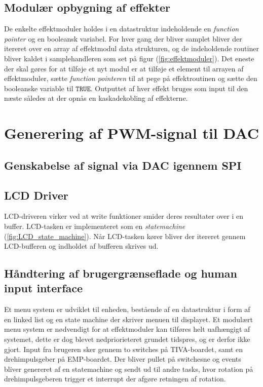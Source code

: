 \subsection{Modulær opbygning af effekter}
De enkelte effektmoduler holdes i en datastruktur indeholdende en \textit{function pointer} og en booleansk variabel.
For hver gang der bliver samplet bliver der itereret over en array af effektmodul data strukturen, og de indeholdende routiner bliver kaldet i samplehandleren som set på figur (\ref{fig:effektmoduler}).\newline
Det eneste der skal gøres for at tilføje et nyt modul er at tilføje et element til arrayen af effektmoduler, sætte \textit{function pointeren} til at pege på effektroutinen og sætte den booleanske variable til $\mathtt{TRUE}$.
Outputtet af hver effekt bruges som input til den næste således at der opnås en kaskadekobling af effekterne.


\section{Generering af PWM-signal til DAC}


\subsection{Genskabelse af signal via DAC igennem SPI}


\subsection{LCD Driver}
LCD-driveren virker ved at write funktioner smider deres resultater over i en buffer.
LCD-tasken er implementeret som en \textit{statemachine} (\ref{fig:LCD_state_machine}).
Når LCD-tasken kører bliver der itereret gennem LCD-bufferen og indholdet af bufferen skrives ud.


\subsection{Håndtering af brugergrænseflade og human input interface}

Et menu system er udviklet til enheden, bestående af en datastruktur i form af en linked list og en state machine der skriver menuen til displayet.
Et modulært menu system er nødvendigt for at effektmoduler kan tilføres helt uafhængigt af systemet, dette er dog blevet nedpriorieteret grundet tidspres, og er derfor ikke gjort.
Input fra brugeren sker gennem to switches på TIVA-boardet, samt en drehimpulsgeber på EMP-boardet.
Der bliver pullet på switchesne og events bliver genereret af en statemachine og sendt ud til andre tasks, hvor rotation på drehimpulsgeberen trigger et interrupt der afgøre retningen af rotation.